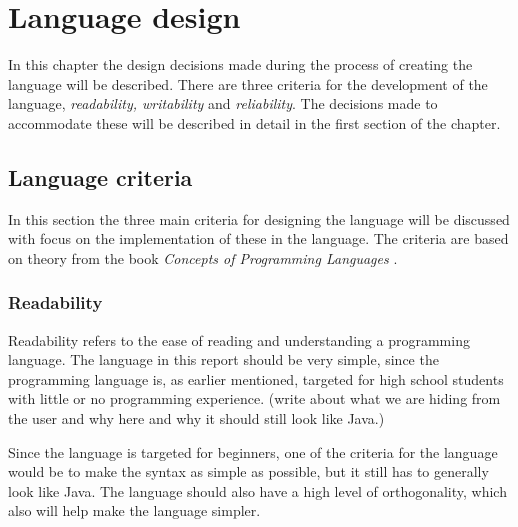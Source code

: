 \chapter{Language design}
\label{chap:LanguageDesign}
In this chapter the design decisions made during the process of creating the language will be described. There are three criteria for the development of the language, \emph{readability, writability} and \emph{reliability}. The decisions made to accommodate these will be described in detail in the first section of the chapter. 
 
\section{Language criteria}

In this section the three main criteria for designing the language will be discussed with focus on the implementation of these in the language. The criteria are based on theory from the book \emph{Concepts of Programming Languages} \citep{Sebesta}.

\subsection{Readability}
Readability refers to the ease of reading and understanding a programming language. The language in this report should be very simple, since the programming language is, as earlier mentioned, targeted for high school students with little or no programming experience. (write about what we are hiding from  the user and why here and why it should still look like Java.)
\label{sec:MoSCoW}

Since the language is targeted for beginners, one of the criteria for the language would be to make the syntax as simple as possible, but it still has to generally look like Java. The language should also have a high level of orthogonality, which also will help make the language simpler. 

